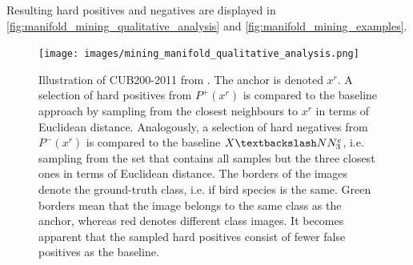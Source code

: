 Resulting hard positives and negatives are displayed in \autoref{fig:manifold_mining_qualitative_analysis} and \autoref{fig:manifold_mining_examples}.

\begin{figure}[h] %
    \centering
    \texttt{[image: images/mining\_manifold\_qualitative\_analysis.png]}
    \caption{Illustration of CUB200-2011 from \citet{mining_manifolds_2018}.
    The anchor is denoted $x^r$.
    A selection of hard positives from $P^+(x^r)$ is compared to the 
    baseline approach by sampling from the closest neighbours to $x^r$ in 
    terms of Euclidean distance.
    Analogously, a selection of hard negatives from $P^-(x^r)$ 
    is compared to the baseline $X \textbackslash NN^e_3$, 
    i.e. sampling from the set that contains all samples but the three closest ones in 
    terms of Euclidean distance.
    The borders of the images denote the ground-truth class, i.e. if bird species is the same.
    Green borders mean that the image belongs to the same class as the anchor,
    whereas red denotes different class images.
    It becomes apparent that the sampled hard positives consist of fewer false positives 
    as the baseline.
    }
    \label{fig:manifold_mining_qualitative_analysis}
\end{figure}

